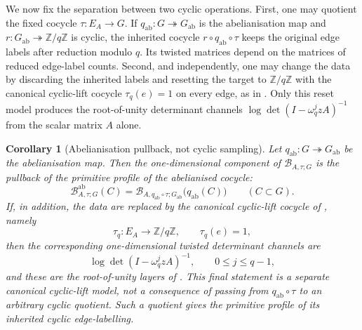 \documentclass[11pt,a4paper]{amsart}
\theoremstyle{plain}
\newtheorem{corollary}[theorem]{Corollary}
\theoremstyle{definition}
\theoremstyle{remark}
\newcommand{\ZZ}{\mathbb{Z}}
\begin{document}
\noindent
We now fix the separation between two cyclic operations. First, one may
quotient the fixed cocycle \(\tau:E_A\to G\). If
\(q_{\mathrm{ab}}:G\twoheadrightarrow G_{\mathrm{ab}}\) is the
abelianisation map and
\(r:G_{\mathrm{ab}}\twoheadrightarrow\ZZ/q\ZZ\) is cyclic, the inherited
cocycle \(r\circ q_{\mathrm{ab}}\circ\tau\) keeps the original edge
labels after reduction modulo \(q\). Its twisted matrices depend on the
matrices of reduced edge-label counts. Second, and independently, one
may change the data by discarding the inherited labels and resetting the
target to \(\ZZ/q\ZZ\) with the canonical cyclic-lift cocycle
\(\tau_q(e)=1\) on every edge, as in
. Only this reset model produces the
root-of-unity determinant channels
\(\log\det(I-\omega_q^j zA)^{-1}\) from the scalar matrix \(A\) alone.

\begin{corollary}[Abelianisation pullback, not cyclic sampling]
  \label{cor:abelian-cyclic-shadow}
  Let \(q_{\mathrm{ab}}:G\twoheadrightarrow G_{\mathrm{ab}}\) be the
  abelianisation map. Then the one-dimensional component of
  \(\mathcal B_{A,\tau;G}\) is the pullback of the primitive profile of the
  abelianised cocycle:
  \begin{equation}\label{eq:abelian-shadow-pullback}
    \mathcal B_{A,\tau;G}^{\mathrm{ab}}(C)
    =
    \mathcal B_{A,q_{\mathrm{ab}}\circ\tau;G_{\mathrm{ab}}}
      \bigl(q_{\mathrm{ab}}(C)\bigr)
    \qquad (C\subset G).
  \end{equation}
  If, in addition, the data are replaced by the canonical cyclic-lift
  cocycle of , namely
  \[
    \tau_q:E_A\to\ZZ/q\ZZ,
    \qquad \tau_q(e)=1,
  \]
  then the corresponding
  one-dimensional twisted determinant channels are
  \[
    \log\det(I-\omega_q^j zA)^{-1},
    \qquad 0\le j\le q-1,
  \]
  and these are the root-of-unity layers of .
  This final statement is a separate canonical cyclic-lift model, not a
  consequence of passing from \(q_{\mathrm{ab}}\circ\tau\) to an arbitrary
  cyclic quotient. Such a quotient gives the primitive profile of its
  inherited cyclic edge-labelling.
\end{corollary}
\end{document}
